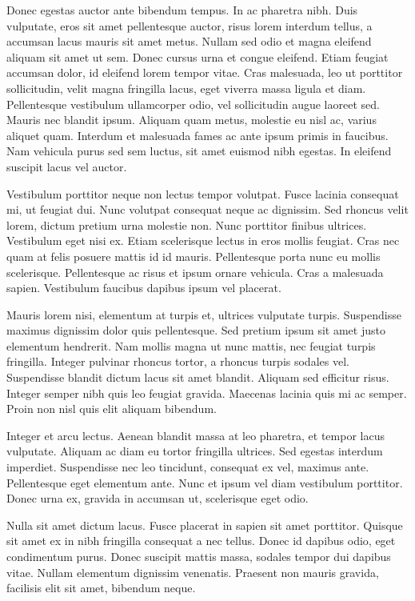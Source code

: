Donec egestas auctor ante bibendum tempus. In ac pharetra nibh. Duis vulputate, eros sit amet pellentesque auctor, risus lorem interdum tellus, a accumsan lacus mauris sit amet metus. Nullam sed odio et magna eleifend aliquam sit amet ut sem. Donec cursus urna et congue eleifend. Etiam feugiat accumsan dolor, id eleifend lorem tempor vitae. Cras malesuada, leo ut porttitor sollicitudin, velit magna fringilla lacus, eget viverra massa ligula et diam. Pellentesque vestibulum ullamcorper odio, vel sollicitudin augue laoreet sed. Mauris nec blandit ipsum. Aliquam quam metus, molestie eu nisl ac, varius aliquet quam. Interdum et malesuada fames ac ante ipsum primis in faucibus. Nam vehicula purus sed sem luctus, sit amet euismod nibh egestas. In eleifend suscipit lacus vel auctor.

Vestibulum porttitor neque non lectus tempor volutpat. Fusce lacinia consequat mi, ut feugiat dui. Nunc volutpat consequat neque ac dignissim. Sed rhoncus velit lorem, dictum pretium urna molestie non. Nunc porttitor finibus ultrices. Vestibulum eget nisi ex. Etiam scelerisque lectus in eros mollis feugiat. Cras nec quam at felis posuere mattis id id mauris. Pellentesque porta nunc eu mollis scelerisque. Pellentesque ac risus et ipsum ornare vehicula. Cras a malesuada sapien. Vestibulum faucibus dapibus ipsum vel placerat.

Mauris lorem nisi, elementum at turpis et, ultrices vulputate turpis. Suspendisse maximus dignissim dolor quis pellentesque. Sed pretium ipsum sit amet justo elementum hendrerit. Nam mollis magna ut nunc mattis, nec feugiat turpis fringilla. Integer pulvinar rhoncus tortor, a rhoncus turpis sodales vel. Suspendisse blandit dictum lacus sit amet blandit. Aliquam sed efficitur risus. Integer semper nibh quis leo feugiat gravida. Maecenas lacinia quis mi ac semper. Proin non nisl quis elit aliquam bibendum.

Integer et arcu lectus. Aenean blandit massa at leo pharetra, et tempor lacus vulputate. Aliquam ac diam eu tortor fringilla ultrices. Sed egestas interdum imperdiet. Suspendisse nec leo tincidunt, consequat ex vel, maximus ante. Pellentesque eget elementum ante. Nunc et ipsum vel diam vestibulum porttitor. Donec urna ex, gravida in accumsan ut, scelerisque eget odio.

Nulla sit amet dictum lacus. Fusce placerat in sapien sit amet porttitor. Quisque sit amet ex in nibh fringilla consequat a nec tellus. Donec id dapibus odio, eget condimentum purus. Donec suscipit mattis massa, sodales tempor dui dapibus vitae. Nullam elementum dignissim venenatis. Praesent non mauris gravida, facilisis elit sit amet, bibendum neque.

